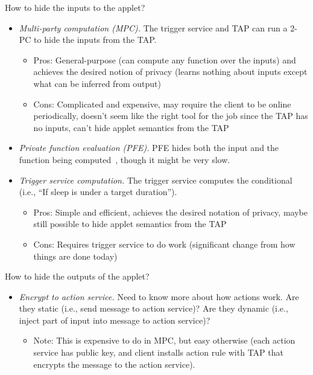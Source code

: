 How to hide the inputs to the applet?
\begin{itemize}[leftmargin=*]
  \item \emph{Multi-party computation (MPC).} The trigger service and TAP can
    run a 2-PC to hide the inputs from the TAP.
    \begin{itemize}
      \item Pros: General-purpose (can compute any function over the inputs) and
        achieves the desired notion of privacy (learns nothing about inputs
        except what can be inferred from output)
      \item Cons: Complicated and expensive, may require the client to be online
        periodically, doesn't seem like the right tool for the job since the TAP
        has no inputs, can't hide applet semantics from the TAP
    \end{itemize}
  \item \emph{Private function evaluation (PFE).} PFE hides both the input and
    the function being computed~\cite{DBLP:conf/eurocrypt/MohasselS13}, though
    it might be very slow.
  \item \emph{Trigger service computation.} The trigger service computes the
    conditional (i.e., ``If sleep is under a target duration'').
    \begin{itemize}
      \item Pros: Simple and efficient, achieves the desired notation of
        privacy, maybe still possible to hide applet semantics from the TAP
      \item Cons: Requires trigger service to do work (significant change from
        how things are done today)
    \end{itemize}
\end{itemize}\bigskip

How to hide the outputs of the applet?
\begin{itemize}[leftmargin=*]
  \item \emph{Encrypt to action service.} Need to know more about how actions
    work. Are they static (i.e., send message to action service)? Are they
    dynamic (i.e., inject part of input into message to action service)?
    \begin{itemize}
      \item Note: This is expensive to do in MPC, but easy otherwise (each
        action service has public key, and client installs action rule with TAP
        that encrypts the message to the action service).
    \end{itemize}
\end{itemize}\bigskip

